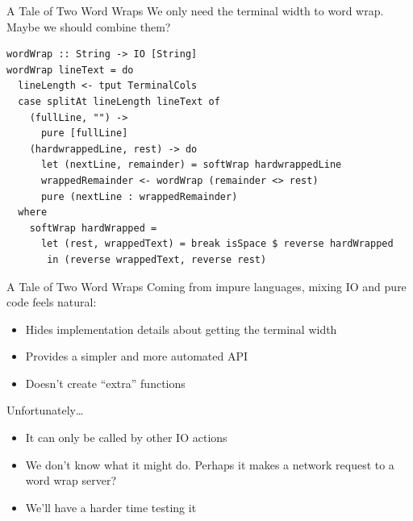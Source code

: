 \documentclass[10pt, presentation, colorlinks]{beamer}
\begin{document}
\begin{frame}[label={sec:org37f648a},fragile]{A Tale of Two Word Wraps}
 We only need the terminal width to word wrap. Maybe we should combine them?
\pause

\begin{verbatim}
wordWrap :: String -> IO [String]
wordWrap lineText = do
  lineLength <- tput TerminalCols
  case splitAt lineLength lineText of
    (fullLine, "") ->
      pure [fullLine]
    (hardwrappedLine, rest) -> do
      let (nextLine, remainder) = softWrap hardwrappedLine
      wrappedRemainder <- wordWrap (remainder <> rest)
      pure (nextLine : wrappedRemainder)
  where
    softWrap hardWrapped =
      let (rest, wrappedText) = break isSpace $ reverse hardWrapped
       in (reverse wrappedText, reverse rest)
\end{verbatim}
\end{frame}

\begin{frame}[label={sec:orgc421d09}]{A Tale of Two Word Wraps}
Coming from impure languages, mixing IO and pure code feels natural:

\pause
\begin{itemize}
\item Hides implementation details about getting the terminal width
\end{itemize}
\pause
\begin{itemize}
\item Provides a simpler and more automated API
\end{itemize}
\pause
\begin{itemize}
\item Doesn't create “extra” functions
\end{itemize}

\bigskip
\pause
Unfortunately\ldots{}

\bigskip
\pause
\begin{itemize}
\item It can only be called by other IO actions
\end{itemize}
\pause
\begin{itemize}
\item We don't know what it might do. Perhaps it makes a network request to a word wrap server?
\end{itemize}
\pause
\begin{itemize}
\item We'll have a harder time testing it
\end{itemize}
\end{frame}
\end{document}
